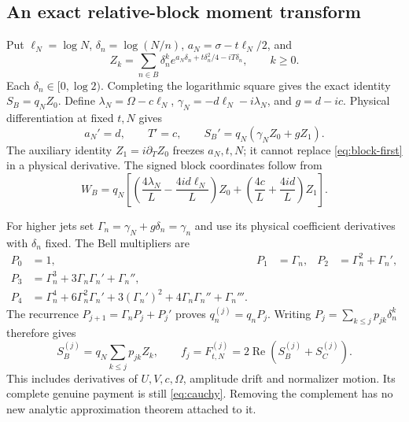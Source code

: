 \documentclass[11pt]{article}
\numberwithin{equation}{section}
\theoremstyle{definition}
\theoremstyle{remark}
\DeclareMathOperator{\Rea}{Re}
\begin{document}
\subsection{An exact relative-block moment transform}
Put $\ell_N=\log N$, $\delta_n=\log(N/n)$,
$a_N=\sigma-t\ell_N/2$, and
\begin{equation}
 Z_k=\sum_{n\in B}\delta_n^k
       e^{a_N\delta_n+t\delta_n^2/4-iT\delta_n},\qquad k\ge0.
 \label{eq:Z}
\end{equation}
Each $\delta_n\in[0,\log2)$. Completing the logarithmic square gives
the exact identity $S_B=q_NZ_0$. Define
$\lambda_N=\Omega-c\ell_N$, $\gamma_N=-d\ell_N-i\lambda_N$,
and $g=d-ic$. Physical differentiation at fixed $t,N$ gives
\begin{equation}
 a_N'=d,\qquad T'=c,\qquad
 S_B'=q_N(\gamma_NZ_0+gZ_1).
 \label{eq:block-first}
\end{equation}
The auxiliary identity $Z_1=i\partial_TZ_0$ freezes $a_N,t,N$;
it cannot replace \eqref{eq:block-first} in a physical derivative.
The signed block coordinates follow from
\[
 W_B=q_N\left[
 \left(\frac{4\lambda_N}{L}-\frac{4id\ell_N}{L}\right)Z_0
 +\left(\frac{4c}{L}+\frac{4id}{L}\right)Z_1\right].
\]

For higher jets set $\Gamma_n=\gamma_N+g\delta_n=\gamma_n$ and
use its physical coefficient derivatives with $\delta_n$ fixed.
The Bell multipliers are
\begin{align}
 P_0&=1,&P_1&=\Gamma_n,&P_2&=\Gamma_n^2+\Gamma_n',\nonumber\\
 P_3&=\Gamma_n^3+3\Gamma_n\Gamma_n'+\Gamma_n'',\label{eq:bell}\\
 P_4&=\Gamma_n^4+6\Gamma_n^2\Gamma_n'
        +3(\Gamma_n')^2+4\Gamma_n\Gamma_n''+\Gamma_n'''.\nonumber
\end{align}
The recurrence $P_{j+1}=\Gamma_nP_j+P_j'$ proves
$q_n^{(j)}=q_nP_j$. Writing $P_j=\sum_{k\le j}p_{jk}\delta_n^k$
therefore gives
\begin{equation}
 S_B^{(j)}=q_N\sum_{k\le j}p_{jk}Z_k,\qquad
 f_j=F_{t,N}^{(j)}=2\Rea(S_B^{(j)}+S_C^{(j)}).
 \label{eq:complete-jets}
\end{equation}
This includes derivatives of $U,V,c,\Omega$, amplitude drift and
normalizer motion. Its complete genuine payment is still
\eqref{eq:cauchy}. Removing the complement has no new analytic
approximation theorem attached to it.
\end{document}
